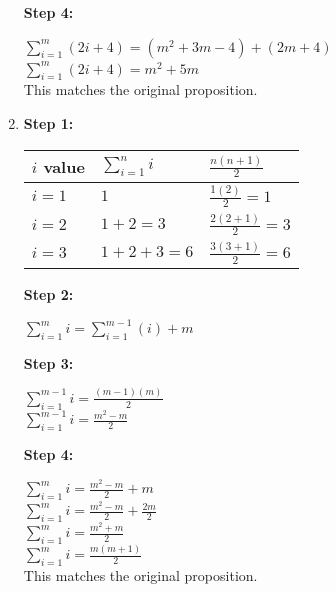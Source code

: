 \begin{enumerate}
            \textbf{Step 4:}
            
            $ \sum_{i=1}^{m} (2i+4) = (m^{2} + 3m - 4) + (2m+4) $ ~\\
            $ \sum_{i=1}^{m} (2i+4) = m^{2} + 5m $ ~\\
            This matches the original proposition.

        \item
            \textbf{Step 1:}
            
                \begin{tabular}{l | p{4cm} | p{4cm} }
                    \textbf{ $i$ value } &
                    \textbf{ $ \sum_{i=1}^{n} i $ } &
                    \textbf{ $ \frac{n(n+1)}{2} $ }
                    \\ \hline
                    $i = 1$ &
                        { $1$ }{} &
                        { $\frac{1(2)}{2} = 1$ }{} 

                    \\ 
                    $i = 2$ &
                        { $1 + 2 = 3$ }{} &
                        { $ \frac{2(2+1)}{2} = 3 $ }{} 

                    \\ 
                    $i = 3$ &
                        { $ 1 + 2 + 3 = 6$ }{} &
                        { $ \frac{3(3+1)}{2} = 6 $ }{} 
                \end{tabular}
            
            \textbf{Step 2:}
            
                $ \sum_{i=1}^{m} i = \sum_{i=1}^{m-1} (i) + m$

            \textbf{Step 3:}
            
                $ \sum_{i=1}^{m-1} i = \frac{(m-1)(m)}{2} $ ~\\
                $ \sum_{i=1}^{m-1} i = \frac{m^{2} - m}{2} $
                
            \textbf{Step 4:}
            
                $ \sum_{i=1}^{m} i = \frac{m^{2} - m}{2} + m $ ~\\
                $ \sum_{i=1}^{m} i = \frac{m^{2} - m}{2} + \frac{2m}{2} $ ~\\
                $ \sum_{i=1}^{m} i = \frac{m^{2} + m}{2} $ ~\\
                $ \sum_{i=1}^{m} i = \frac{m(m + 1)}{2} $ ~\\
                This matches the original proposition.
    \end{enumerate}
   
    

